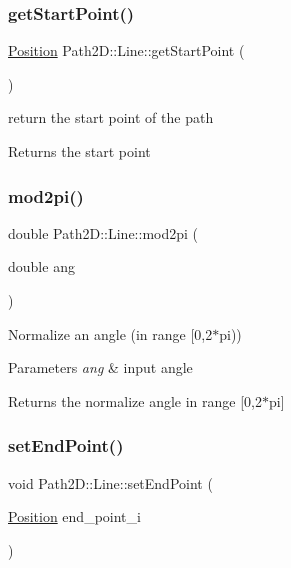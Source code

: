 \subsubsection{\texorpdfstring{get\+Start\+Point()}{getStartPoint()}}
{\footnotesize\ttfamily \mbox{\hyperlink{class_path2_d_1_1_position}{Position}} Path2\+D\+::\+Line\+::get\+Start\+Point (\begin{DoxyParamCaption}{ }\end{DoxyParamCaption})}



return the start point of the path 

\begin{DoxyReturn}{Returns}
the start point 
\end{DoxyReturn}
\mbox{\label{class_path2_d_1_1_line_adac6f454be2ea8a8b6a05ae8212c093c}} 
\subsubsection{\texorpdfstring{mod2pi()}{mod2pi()}}
{\footnotesize\ttfamily double Path2\+D\+::\+Line\+::mod2pi (\begin{DoxyParamCaption}\item[{double}]{ang }\end{DoxyParamCaption})}



Normalize an angle (in range \mbox{[}0,2$\ast$pi)) 


\begin{DoxyParams}{Parameters}
{\em ang} & input angle \\
\hline
\end{DoxyParams}
\begin{DoxyReturn}{Returns}
the normalize angle in range \mbox{[}0,2$\ast$pi\mbox{]} 
\end{DoxyReturn}
\mbox{\label{class_path2_d_1_1_line_aa937427619ef1923ab1cbc1aeb2e09f4}} 
\subsubsection{\texorpdfstring{set\+End\+Point()}{setEndPoint()}}
{\footnotesize\ttfamily void Path2\+D\+::\+Line\+::set\+End\+Point (\begin{DoxyParamCaption}\item[{\mbox{\hyperlink{class_path2_d_1_1_position}{Position}}}]{end\+\_\+point\+\_\+i }\end{DoxyParamCaption})}



